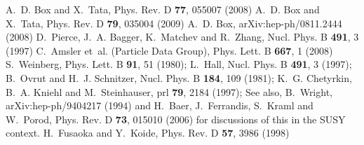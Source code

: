 \def\refname{\large\bf References for \progrge}
\begin{thebibliography}{99} %
 A.~D. Box and X.~Tata, Phys. Rev. D \textbf{77}, 055007
(2008) %
 A.~D. Box and X.~Tata, Phys. Rev. D \textbf{79}, 035004
(2009) %
 A.~D. Box, {a}rXiv:hep-ph/0811.2444 (2008) %
 D.~Pierce, J.~A. Bagger, K.~Matchev and R.~Zhang, Nucl.
Phys. B
\textbf{491}, 3 (1997) %
 C.~\mbox{Amsler} et~al. {(Particle Data Group)}, Phys.
Lett. B
\textbf{667}, 1 (2008) %
 S.~Weinberg, Phys. Lett. B \textbf{91}, 51
(1980); L.~Hall, Nucl. Phys. B \textbf{491}, 3 (1997); B.~Ovrut and
H.~J. Schnitzer, Nucl. Phys. B \textbf{184}, 109 (1981); K.~G.
Chetyrkin, B.~A. Kniehl and M.~Steinhauser, prl \textbf{79}, 2184
(1997); See also, B.~Wright, arXiv:hep-ph/9404217 (1994) and H.~Baer,
J.~Ferrandis, S.~Kraml and W.~Porod, Phys. Rev. D {\bf 73}, 015010
(2006) for discussions of this in the SUSY context.  %
 H.~Fusaoka and Y.~Koide, Phys. Rev. D \textbf{57},
3986 (1998) %
\end{thebibliography}
